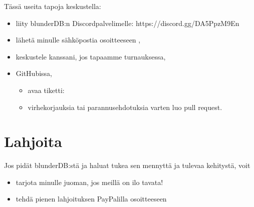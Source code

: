 \documentclass[letterpaper,10pt,finnish]{sphinxmanual}
\begin{document}
\sphinxAtStartPar
Tässä useita tapoja keskustella:
\begin{itemize}
\item {} 
\sphinxAtStartPar
liity blunderDB:n Discord\sphinxhyphen{}palvelimelle: https://discord.gg/DA5PpzM9En

\item {} 
\sphinxAtStartPar
lähetä minulle sähköpostia osoitteeseen ,

\item {} 
\sphinxAtStartPar
keskustele kanssani, jos tapaamme turnauksessa,

\item {} 
\sphinxAtStartPar
GitHubissa,
\begin{itemize}
\item {} 
\sphinxAtStartPar
avaa tiketti: 

\item {} 
\sphinxAtStartPar
virhekorjauksia tai parannusehdotuksia varten luo pull request.

\end{itemize}

\end{itemize}


\chapter{Lahjoita}
\label{\detokenize{index:faire-un-don}}
\sphinxAtStartPar
Jos pidät blunderDB:stä ja haluat tukea sen mennyttä ja tulevaa kehitystä, voit
\begin{itemize}
\item {} 
\sphinxAtStartPar
tarjota minulle juoman, jos meillä on ilo tavata!

\item {} 
\sphinxAtStartPar
tehdä pienen lahjoituksen PayPalilla osoitteeseen 

\end{itemize}
\end{document}
